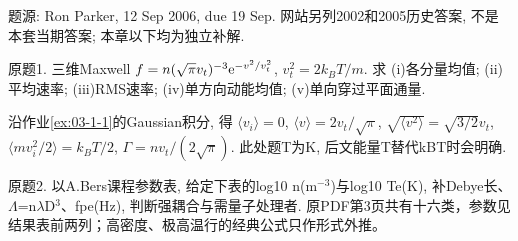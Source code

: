 题源: Ron Parker, 12 Sep 2006, due 19 Sep. 网站另列2002和2005历史答案, 不是本套当期答案; 本章以下均为独立补解.
\begin{exercise}\label{ex:06-1-1}
原题1. 三维Maxwell $f=n(\sqrt\pi v_t)^{-3}\mathrm e^{-v^2/v_t^2}$, $v_t^2=2k_BT/m$. 求 (i)各分量均值; (ii)平均速率; (iii)RMS速率; (iv)单方向动能均值; (v)单向穿过平面通量.
\end{exercise}
\begin{solution}
沿作业\ref{ex:03-1-1}的Gaussian积分, 得 $\langle v_i\rangle=0$, $\langle v\rangle=2v_t/\sqrt\pi$, $\sqrt{\langle v^2\rangle}=\sqrt{3/2}v_t$, $\langle mv_i^2/2\rangle=k_BT/2$, $\Gamma=nv_t/(2\sqrt\pi)$. 此处题T为K, 后文能量T替代kBT时会明确.
\end{solution}
\begin{exercise}\label{ex:06-1-2}
原题2. 以A.Bers课程参数表, 给定下表的log10 n(m$^{-3}$)与log10 Te(K), 补Debye长、\ensuremath{\Lambda}=n\ensuremath{\lambda}D\ensuremath{{}^{3}}、fpe(Hz), 判断强耦合与需量子处理者. 原PDF第3页共有十六类，参数见结果表前两列；高密度、极高温行的经典公式只作形式外推。
\end{exercise}
